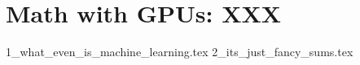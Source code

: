 \section{Math with GPUs: XXX}

{1_what_even_is_machine_learning.tex}
{2_its_just_fancy_sums.tex}




























